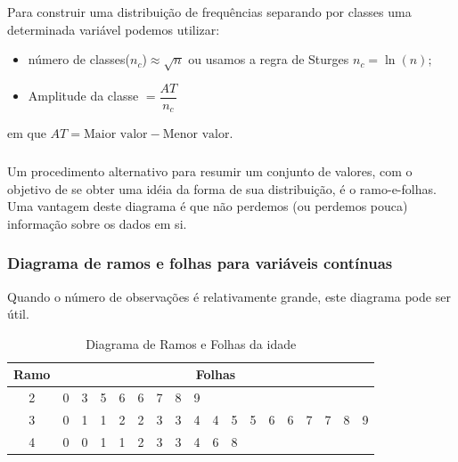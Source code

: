 \documentclass[14pt,aspectratio=1610]{beamer}
\begin{document}
\begin{frame}{}
\frametitle{}
\begin{block}{}
\justifying
Para construir uma distribuição de frequências separando por classes uma determinada variável podemos utilizar:
\begin{itemize}
\item número de classes($n_{c}$)$\approx \sqrt{n}$ ou usamos a regra de Sturges 
$n_{c}=\ln{(n)};$
\item Amplitude da classe $=\dfrac{AT}{n_{c}}$
\end{itemize}
em que $AT=\textrm{Maior valor} - \textrm{Menor valor}.$
\end{block}
\end{frame}

\begin{frame}{}
\frametitle{}
\begin{block}{}
\justifying
Um procedimento alternativo para resumir um conjunto de valores, com o objetivo de se
obter uma idéia da forma de sua distribuição, é o ramo-e-folhas. Uma vantagem deste diagrama é que não perdemos (ou perdemos pouca) informação sobre os dados em si.
\end{block}
\end{frame}

\begin{frame}{}
\frametitle{Diagrama de ramos e folhas para variáveis contínuas}
\begin{block}{}
\justifying
Quando o número de observações é relativamente grande, este diagrama pode ser útil.
\begin{table}[H]
\caption{Diagrama de Ramos e Folhas da idade}
\begin{tabular}{c|ccccccccccccccccc}
Ramo&\multicolumn{17}{c}{Folhas}\\
\hline
2&0&3&5&6&6&7&8&9& & & & & & & & & \\
3&0&1&1&2&2&3&3&4&4&5&5&6&6&7&7&8&9\\
4&0&0&1&1&2&3&3&4&6&8& & & & & & & 
\end{tabular}
\end{table}
\end{block}
\end{frame}
\end{document}
